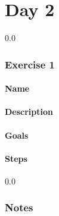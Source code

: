 \part{Day 2}
{\setlength{\baselineskip}%
  {0.0\baselineskip}
  \section*{\flushright Exercise 1}
  \hrulefill \par}
\subsection{Name}

\subsection{Description}

\subsection{Goals}

\subsection{Steps}

\newpage
  {\setlength{\baselineskip}%
           {0.0\baselineskip}
  \section*{Notes}
  \hrulefill \par}